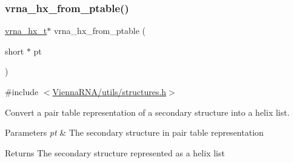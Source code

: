 \subsubsection{\texorpdfstring{vrna\+\_\+hx\+\_\+from\+\_\+ptable()}{vrna\_hx\_from\_ptable()}}
{\footnotesize\ttfamily \hyperlink{group__struct__utils__helix__list_ga877363f3a1703b53ecd025c6fcf897a0}{vrna\+\_\+hx\+\_\+t}$\ast$ vrna\+\_\+hx\+\_\+from\+\_\+ptable (\begin{DoxyParamCaption}\item[{short $\ast$}]{pt }\end{DoxyParamCaption})}



{\ttfamily \#include $<$\hyperlink{utils_2structures_8h}{Vienna\+R\+N\+A/utils/structures.\+h}$>$}



Convert a pair table representation of a secondary structure into a helix list. 


\begin{DoxyParams}{Parameters}
{\em pt} & The secondary structure in pair table representation \\
\hline
\end{DoxyParams}
\begin{DoxyReturn}{Returns}
The secondary structure represented as a helix list 
\end{DoxyReturn}
